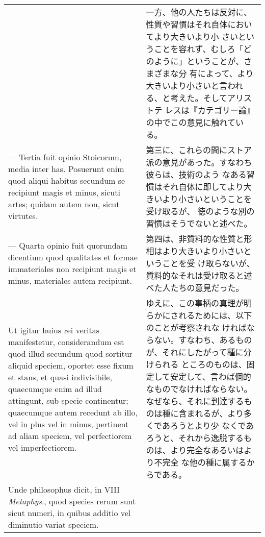 \documentclass[10pt]{jsarticle} %
\begin{document}
\begin{longtable}{p{21em}p{21em}}
&

一方、他の人たちは反対に、性質や習慣はそれ自体においてより大きいより小
さいということを容れず、むしろ「どのように」ということが、さまざまな分
有によって、より大きいより小さいと言われる、と考えた。そしてアリストテ
レスは『カテゴリー論』の中でこの意見に触れている。

\\


--- Tertia
fuit opinio Stoicorum, media inter has. Posuerunt enim quod aliqui
habitus secundum se recipiunt magis et minus, sicuti artes; quidam
autem non, sicut virtutes. 


&

第三に、これらの間にストア派の意見があった。すなわち彼らは、技術のよう
なある習慣はそれ自体に即してより大きいより小さいということを受け取るが、
徳のような別の習慣はそうでないと述べた。

\\



--- Quarta opinio fuit quorundam dicentium quod
qualitates et formae immateriales non recipiunt magis et minus,
materiales autem recipiunt. 


&

第四は、非質料的な性質と形相はより大きいより小さいということを受
け取らないが、質料的なそれは受け取ると述べた人たちの意見だった。

\\


Ut igitur huius rei veritas manifestetur,
considerandum est quod illud secundum quod sortitur aliquid speciem,
oportet esse fixum et stans, et quasi indivisibile, quaecumque enim ad
illud attingunt, sub specie continentur; quaecumque autem recedunt ab
illo, vel in plus vel in minus, pertinent ad aliam speciem, vel
perfectiorem vel imperfectiorem. 


&

ゆえに、この事柄の真理が明らかにされるためには、以下のことが考察されな
 ければならない。すなわち、あるものが、それにしたがって種に分けられる
 ところのものは、固定して安定して、言わば個的なものでなければならない。
なぜなら、それに到達するものは種に含まれるが、より多くであろうとより少
 なくであろうと、それから逸脱するものは、より完全なあるいはより不完全
 な他の種に属するからである。

\\


Unde philosophus dicit, in VIII
{\itshape Metaphys}., quod species rerum sunt sicut numeri, in quibus additio vel
diminutio variat speciem. 



\end{longtable}
\end{document}

